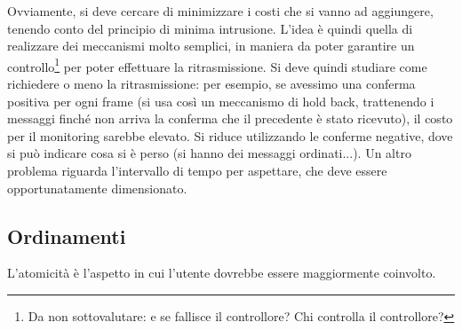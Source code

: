 Ovviamente, si deve cercare di minimizzare i costi che si vanno ad aggiungere, tenendo conto del principio di minima
intrusione.
L'idea è quindi quella di realizzare dei meccanismi molto semplici, in maniera da poter garantire un
controllo\footnote{Da non sottovalutare: e se fallisce il controllore? Chi controlla il controllore?} per
poter effettuare la ritrasmissione. Si deve quindi studiare come richiedere o meno la ritrasmissione: per esempio, se
avessimo una conferma positiva per ogni frame (si usa così un meccanismo di hold back, trattenendo i messaggi finché
non arriva la conferma che il precedente è stato ricevuto), il costo per il monitoring sarebbe elevato. Si riduce
utilizzando le conferme negative, dove si può indicare cosa si è perso (si hanno dei messaggi ordinati...). Un altro
problema riguarda l'intervallo di tempo per aspettare, che deve essere opportunatamente dimensionato.
\subsection{Ordinamenti}
L'atomicità è l'aspetto in cui l'utente dovrebbe essere maggiormente coinvolto.

